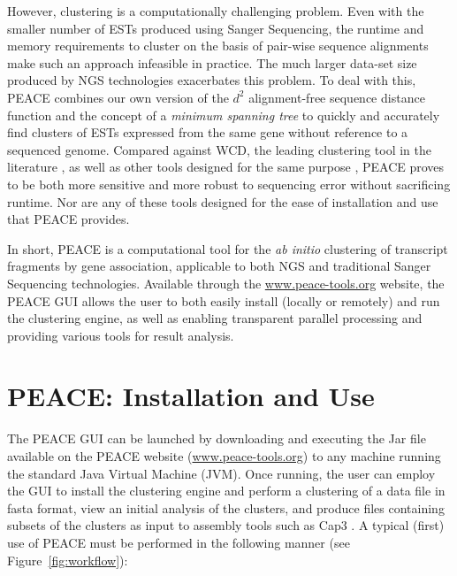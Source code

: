 \documentclass[a4,center,fleqn]{NAR}
\newcommand{\peace} {{\small PEACE}}
\newcommand{\wcd} {{\small WCD}}
\newcommand{\capthree} {{\small Cap3}}
\begin{document}
However, clustering is a computationally challenging problem.  Even
with the smaller number of ESTs produced using Sanger Sequencing, the
runtime and memory requirements to cluster on the basis of pair-wise
sequence alignments make such an approach infeasible in practice.  The
much larger data-set size produced by NGS technologies exacerbates
this problem.  To deal with this, \peace\/ combines our own version of
the $d^2$ alignment-free sequence distance function \cite{Hide94} and
the concept of a {\it minimum spanning tree} \cite{Prim57} to quickly
and accurately find clusters of ESTs expressed from the same gene
without reference to a sequenced genome.  Compared against \wcd, the
leading clustering tool in the literature \cite{Hazelhurst08a}, as well as
other tools designed for the same purpose 
\cite{Burke99,Slater00,Huang99,Parkinson02,Kalyanaraman03,Malde03,
  Ptitsyn05,Hazelhurst08a,Picardi09}, \peace\/ proves to be both more
sensitive and more robust to sequencing error without sacrificing
runtime.  Nor are any of these tools designed for the ease of installation
and use that \peace\/ provides.

In short, \peace\/ is a computational tool for the {\it ab initio}
clustering of transcript fragments by gene association, applicable to
both NGS and traditional Sanger Sequencing technologies.  Available
through the \href{http://www.peace-tools.org}{www.peace-tools.org}
website, the \peace\/ GUI allows the user to both easily install
(locally or remotely) and run the clustering engine, as well as
enabling transparent parallel processing and providing various tools
for result analysis.

\section{\peace\/: Installation and Use}

The \peace\/ GUI can be launched by downloading and executing the
Jar file available on the \peace\/ website
(\href{http://www.peace-tools.org}{www.peace-tools.org}) to any
machine running the standard Java Virtual Machine (JVM).  Once
running, the user can employ the GUI to install the clustering engine
and perform a clustering of a data file in {\sc fasta} format, view an
initial analysis of the clusters, and produce files containing subsets
of the clusters as input to assembly tools such as \capthree\/ 
\cite{Huang99}.  A typical (first) use of \peace\/ must be
performed in the following manner (see Figure~\ref{fig:workflow}):
\end{document}

